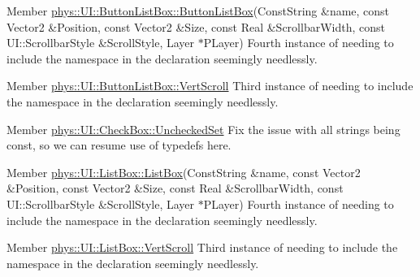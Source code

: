 \label{todo__todo000024}
\hypertarget{todo__todo000024}{}
 
\begin{DoxyDescription}
\item[Member \hyperlink{classphys_1_1UI_1_1ButtonListBox_a0728b3456dc7abba4e1d8945ee4e2dfa}{phys::UI::ButtonListBox::ButtonListBox}(ConstString \&name, const Vector2 \&Position, const Vector2 \&Size, const Real \&ScrollbarWidth, const UI::ScrollbarStyle \&ScrollStyle, Layer $\ast$PLayer) ]Fourth instance of needing to include the namespace in the declaration seemingly needlessly. 
\end{DoxyDescription}

\label{todo__todo000025}
\hypertarget{todo__todo000025}{}
 
\begin{DoxyDescription}
\item[Member \hyperlink{classphys_1_1UI_1_1ButtonListBox_aa47d94d75c58e3408a97766eace2c20e}{phys::UI::ButtonListBox::VertScroll} ]Third instance of needing to include the namespace in the declaration seemingly needlessly. 
\end{DoxyDescription}

\label{todo__todo000026}
\hypertarget{todo__todo000026}{}
 
\begin{DoxyDescription}
\item[Member \hyperlink{classphys_1_1UI_1_1CheckBox_a7b670d93f119193283ec78b94f842429}{phys::UI::CheckBox::UncheckedSet} ]Fix the issue with all strings being const, so we can resume use of typedefs here. 
\end{DoxyDescription}

\label{todo__todo000027}
\hypertarget{todo__todo000027}{}
 
\begin{DoxyDescription}
\item[Member \hyperlink{classphys_1_1UI_1_1ListBox_a2cda27f0fd7392a5e0293af644a215ef}{phys::UI::ListBox::ListBox}(ConstString \&name, const Vector2 \&Position, const Vector2 \&Size, const Real \&ScrollbarWidth, const UI::ScrollbarStyle \&ScrollStyle, Layer $\ast$PLayer) ]Fourth instance of needing to include the namespace in the declaration seemingly needlessly. 
\end{DoxyDescription}

\label{todo__todo000028}
\hypertarget{todo__todo000028}{}
 
\begin{DoxyDescription}
\item[Member \hyperlink{classphys_1_1UI_1_1ListBox_ab2b012b345ff4bb1a5b228fef88d895c}{phys::UI::ListBox::VertScroll} ]Third instance of needing to include the namespace in the declaration seemingly needlessly. 
\end{DoxyDescription}

